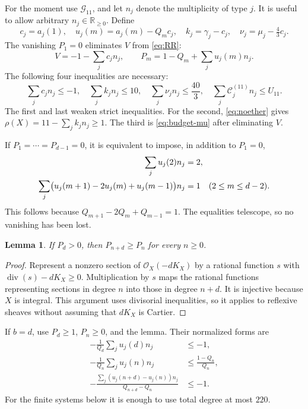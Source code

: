 \documentclass[12pt,a4paper]{article}
\numberwithin{equation}{section}
\newtheorem{lemma}[theorem]{Lemma}
\theoremstyle{definition}
\newcommand{\OO}{\mathcal O}
\newcommand{\divi}{\operatorname{div}}
\newcommand{\cost}{\mathcal C}
\newcommand{\ccat}{\mathscr G}
\begin{document}
For the moment use \(\ccat_{11}\), and let \(n_j\) denote the
multiplicity of type \(j\).
It is useful to allow arbitrary \(n_j\in\mathbb R_{\geq0}\).
Define
\begin{equation}\label{eq:u-definition}
 c_j=a_j(1),\quad u_j(m)=a_j(m)-Q_mc_j,\quad
 k_j=\gamma_j-c_j,\quad \nu_j=\mu_j-\tfrac43c_j.
\end{equation}
The vanishing \(P_1=0\) eliminates \(V\) from
\eqref{eq:RR}:
\begin{equation}\label{eq:linear-RR}
       V=-1-\sum_jc_jn_j,\qquad
       P_m=1-Q_m+\sum_ju_j(m)n_j.
\end{equation}
The following four inequalities are necessary:
\begin{equation}\label{eq:four-global}
 \sum_jc_jn_j\leq-1,\quad
 \sum_jk_jn_j\leq10,\quad
 \sum_j\nu_jn_j\leq\frac{40}{3},\quad
 \sum_j\cost_j^{(11)}n_j\leq U_{11}.
\end{equation}
The first and last weaken strict inequalities.
For the second, \eqref{eq:noether} gives
\(\rho(X)=11-\sum_jk_jn_j\geq1\).
The third is \eqref{eq:budget-mu} after eliminating \(V\).

If \(P_1=\cdots=P_{d-1}=0\), it is equivalent to impose, in addition
to \(P_1=0\),
\begin{align}
 \sum_ju_j(2)n_j&=2,\notag\\
 \sum_j\bigl(u_j(m+1)-2u_j(m)+u_j(m-1)\bigr)n_j&=1
                           \quad(2\leq m\leq d-2).
                         \label{eq:zero-second-diff}
\end{align}
This follows because \(Q_{m+1}-2Q_m+Q_{m-1}=1\).
The equalities telescope, so no vanishing has been lost.

\begin{lemma}\label{lem:multiplication}
If \(P_d>0\), then \(P_{n+d}\geq P_n\) for every \(n\geq0\).
\end{lemma}
\begin{proof}
Represent a nonzero section of \(\OO_X(-dK_X)\) by a rational
function \(s\) with
\(\divi(s)-dK_X\geq0\).
Multiplication by \(s\) maps the rational functions representing
sections in degree \(n\) into those in degree \(n+d\).
It is injective because \(X\) is integral.
This argument uses divisorial inequalities, so it applies to
reflexive sheaves without assuming that \(dK_X\) is Cartier.
\end{proof}

If \(b=d\), use \(P_d\geq1\), \(P_n\geq0\), and the lemma.
Their normalized forms are
\begin{align}
 -\frac1{Q_d}\sum_ju_j(d)n_j&\leq-1,\label{eq:first-row}\\
 -\frac1{Q_n}\sum_ju_j(n)n_j&\leq\frac{1-Q_n}{Q_n},
                                      \label{eq:nonneg-row}\\
 -\frac{\sum_j(u_j(n+d)-u_j(n))n_j}{Q_{n+d}-Q_n}&\leq-1.
                                      \label{eq:shift-row}
\end{align}
For the finite systems below it is enough to use total degree at most
\(220\).
\end{document}
